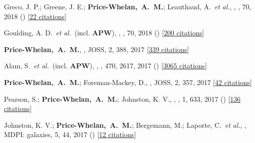 \item[{\color{deemph}\scriptsize34}]Greco, J. P.; Greene, J. E.; \textbf{Price-Whelan,~A.~M.}; Leauthaud, A.~\textit{et al.}, , \pasj, 70, 2018 () [\href{http://adsabs.harvard.edu/abs/2018PASJ...70S..19G}{22 citations}]

\item[{\color{deemph}\scriptsize33}]Goulding, A. D.~\textit{et al.}~(incl. \textbf{APW}), , \pasj, 70, 2018 () [\href{http://adsabs.harvard.edu/abs/2018PASJ...70S..37G}{200 citations}]

\item[{\color{deemph}\scriptsize32}]\textbf{Price-Whelan,~A.~M.}, , JOSS, 2, 388, 2017 [\href{http://adsabs.harvard.edu/abs/2017JOSS....2..388P}{339 citations}]

\item[{\color{deemph}\scriptsize31}]Alam, S.~\textit{et al.}~(incl. \textbf{APW}), , \mnras, 470, 2617, 2017 () [\href{http://adsabs.harvard.edu/abs/2017MNRAS.470.2617A}{3065 citations}]

\item[{\color{deemph}\scriptsize30}]\textbf{Price-Whelan,~A.~M.}; Foreman-Mackey, D., , JOSS, 2, 357, 2017 [\href{http://adsabs.harvard.edu/abs/2017JOSS....2..357P}{42 citations}]

\item[{\color{deemph}\scriptsize29}]Pearson, S.; \textbf{Price-Whelan,~A.~M.}; Johnston, K. V., , \natureast, 1, 633, 2017 () [\href{http://adsabs.harvard.edu/abs/2017NatAs...1..633P}{136 citations}]

\item[{\color{deemph}\scriptsize28}]Johnston, K. V.; \textbf{Price-Whelan,~A.~M.}; Bergemann, M.; Laporte, C.~\textit{et al.}, , MDPI: galaxies, 5, 44, 2017 () [\href{http://adsabs.harvard.edu/abs/2017Galax...5...44J}{12 citations}]

